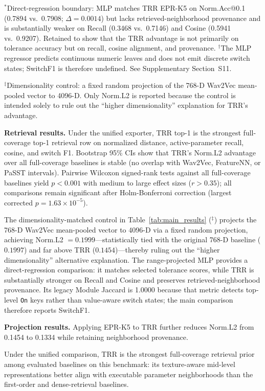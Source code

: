 $^*$Direct-regression boundary: MLP matches TRR EPR-K5 on Norm.Acc@0.1 (0.7894 vs.\ 0.7908; $\Delta=0.0014$) but lacks retrieved-neighborhood provenance and is substantially weaker on Recall (0.3468 vs.\ 0.7146) and Cosine (0.5941 vs.\ 0.9207). Retained to show that the TRR advantage is not primarily on tolerance accuracy but on recall, cosine alignment, and provenance.
$^{\dagger}$The MLP regressor predicts continuous numeric leaves and does not emit discrete switch states; SwitchF1 is therefore undefined. See Supplementary Section~S11.

$^\ddagger$Dimensionality control: a fixed random projection of the 768-D Wav2Vec mean-pooled vector to 4096-D. Only Norm.L2 is reported because the control is intended solely to rule out the ``higher dimensionality'' explanation for TRR's advantage.

\textbf{Retrieval results.} Under the unified exporter, TRR top-1 is the strongest full-coverage top-1 retrieval row on normalized distance, active-parameter recall, cosine, and switch F1. Bootstrap 95\% CIs show that TRR's Norm.L2 advantage over all full-coverage baselines is stable (no overlap with Wav2Vec, FeatureNN, or PaSST intervals). Pairwise Wilcoxon signed-rank tests against all full-coverage baselines yield $p < 0.001$ with medium to large effect sizes ($r > 0.35$); all comparisons remain significant after Holm-Bonferroni correction (largest corrected $p = 1.63 \times 10^{-5}$).

The dimensionality-matched control in Table~\ref{tab:main_results} ($^\ddagger$) projects the 768-D Wav2Vec mean-pooled vector to 4096-D via a fixed random projection, achieving Norm.L2 $=0.1999$---statistically tied with the original 768-D baseline ($0.1997$) and far above TRR ($0.1454$)---thereby ruling out the ``higher dimensionality'' alternative explanation. The range-projected MLP provides a direct-regression comparison: it matches selected tolerance scores, while TRR is substantially stronger on Recall and Cosine and preserves retrieved-neighborhood provenance. Its legacy Module Jaccard is 1.0000 because that metric detects top-level \texttt{On} keys rather than value-aware switch states; the main comparison therefore reports SwitchF1.

\textbf{Projection results.} Applying EPR-K5 to TRR further reduces Norm.L2 from 0.1454 to 0.1334 while retaining neighborhood provenance.

Under the unified comparison, TRR is the strongest full-coverage retrieval prior among evaluated baselines on this benchmark: its texture-aware mid-level representations better align with executable parameter neighborhoods than the first-order and dense-retrieval baselines.


